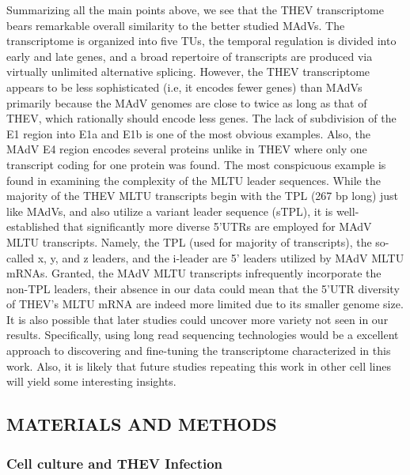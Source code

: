 \documentclass[
]{article}
\begin{document}
Summarizing all the main points above, we see that the THEV
transcriptome bears remarkable overall similarity to the better studied
MAdVs. The transcriptome is organized into five TUs, the temporal
regulation is divided into early and late genes, and a broad repertoire
of transcripts are produced via virtually unlimited alternative
splicing. However, the THEV transcriptome appears to be less
sophisticated (i.e, it encodes fewer genes) than MAdVs primarily because
the MAdV genomes are close to twice as long as that of THEV, which
rationally should encode less genes. The lack of subdivision of the E1
region into E1a and E1b is one of the most obvious examples. Also, the
MAdV E4 region encodes several proteins unlike in THEV where only one
transcript coding for one protein was found. The most conspicuous
example is found in examining the complexity of the MLTU leader
sequences. While the majority of the THEV MLTU transcripts begin with
the TPL (267 bp long) just like MAdVs, and also utilize a variant leader
sequence (sTPL), it is well-established that significantly more diverse
5'UTRs are employed for MAdV MLTU transcripts. Namely, the TPL (used for
majority of transcripts), the so-called x, y, and z leaders, and the
i-leader are 5' leaders utilized by MAdV MLTU mRNAs. Granted, the MAdV
MLTU transcripts infrequently incorporate the non-TPL leaders, their
absence in our data could mean that the 5'UTR diversity of THEV's MLTU
mRNA are indeed more limited due to its smaller genome size. It is also
possible that later studies could uncover more variety not seen in our
results. Specifically, using long read sequencing technologies would be
a excellent approach to discovering and fine-tuning the transcriptome
characterized in this work. Also, it is likely that future studies
repeating this work in other cell lines will yield some interesting
insights. \newpage

\subsection{MATERIALS AND METHODS}\label{materials-and-methods}

\subsubsection{Cell culture and THEV
Infection}\label{cell-culture-and-thev-infection}
\end{document}
